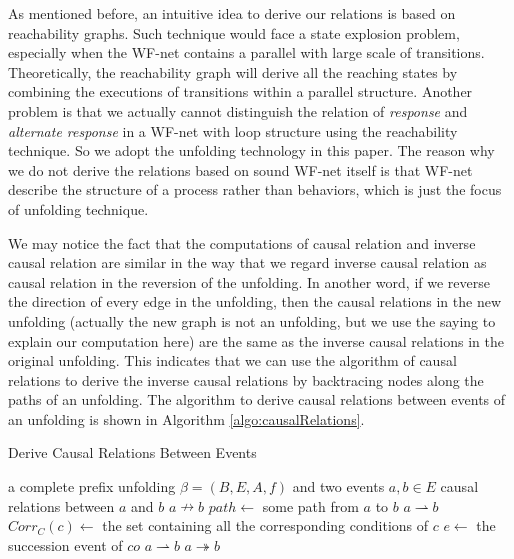 \documentclass{llncs}
\begin{document}
As mentioned before, an intuitive idea to derive our relations is based on reachability graphs. Such technique would face a state explosion problem, especially when the WF-net contains a parallel with large scale of transitions. Theoretically, the reachability graph will derive all the reaching states by combining the executions of transitions within a parallel structure. Another problem is that we actually cannot distinguish the relation of \textit{response} and \textit{alternate response} in a WF-net with loop structure using the reachability technique. So we adopt the unfolding technology in this paper. The reason why we do not derive the relations based on sound WF-net itself is that WF-net describe the structure of a process rather than behaviors, which is just the focus of unfolding technique.

We may notice the fact that the computations of causal relation and inverse causal relation are similar in the way that we regard inverse causal relation as causal relation in the reversion of the unfolding. In another word, if we reverse the direction of every edge in the unfolding, then the causal relations in the new unfolding (actually the new graph is not an unfolding, but we use the saying to explain our computation here) are the same as the inverse causal relations in the original unfolding. This indicates that we can use the algorithm of causal relations to derive the inverse causal relations by backtracing nodes along the paths of an unfolding. The algorithm to derive causal relations between events of an unfolding is shown in Algorithm \ref{algo:causalRelations}. 

\begin{algorithm}[htbp]
\caption{Derive Causal Relations Between Events}
\label{algo:causalRelations}
	\begin{algorithmic}
		\Require a complete prefix unfolding $\beta=(B,E,A,f)$ and two events $a,b\in E$
		\Ensure causal relations between $a$ and $b$
			\State \Return $a\nrightarrow b$
		\EndIf
		\State $path\gets$ some path from $a$ to $b$
			\State \Return $a\rightharpoonup b$
		\Else
				\State $Corr_{C}(c)\gets$ the set containing all the corresponding conditions of $c$
					\State $e\gets$ the succession event of $co$
						\State \Return $a\rightharpoonup b$
					\EndIf
				\EndFor
			\EndFor
		\EndIf
		\State \Return $a\twoheadrightarrow b$
	\end{algorithmic}
\end{algorithm}
\end{document}
